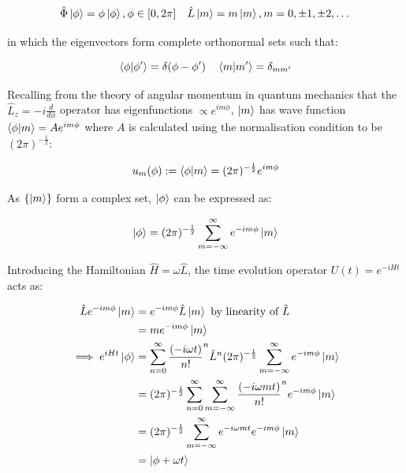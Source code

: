 \documentclass{article}
\begin{document}
\begin{equation}
	\hat{\Phi}\ket{\phi} = \phi\ket{\phi}, \phi \in [0,2\pi] \quad \hat{L}\ket{m} = m\ket{m}, m = 0, \pm 1, \pm 2,\dots
\end{equation}

\noindent in which the eigenvectors form complete orthonormal sets such that:

\begin{equation}
	\braket{\phi|\phi'} = \delta(\phi-\phi ') \quad \braket{m|m'} = \delta_{mm'}
\end{equation}

\noindent Recalling from the theory of angular momentum in quantum mechanics that the $\hat{L}_z = -i \frac{d}{d\phi}$ operator has eigenfunctions $\propto e^{im\phi}$, $\ket{m}$ has wave function $\braket{\phi|m}= Ae^{im\phi}$ where $A$ is calculated using the normalisation condition to be $(2\pi)^{-\frac{1}{2}}$:

\begin{equation}
	u_m(\phi) := \braket{\phi|m} = (2\pi)^{-\frac{1}{2}}e^{im\phi}
\end{equation}

\noindent As $\{\ket{m}\}$ form a complex set, $\ket{\phi}$ can be expressed as:

\begin{equation}
	\ket{\phi} = (2\pi)^{-\frac{1}{2}}\sum_{m=-\infty}^{\infty}e^{-im\phi}\ket{m}
	\label{phiexpansion}
\end{equation}

\noindent Introducing the Hamiltonian $\hat{H}=\omega \hat{L}$, the time evolution operator $U(t) = e^{-iHt}$ acts as:

\begin{align}
\hat{L}e^{-im\phi}\ket{m} &= e^{-im\phi}\hat{L}\ket{m} \text{ by linearity of } \hat{L} \\
				  &= me^{-im\phi}\ket{m} \\
\implies e^{iHt}\ket{\phi} &= \sum_{n=0}^{\infty}\frac{(-i\omega t)}{n!}^n \hat{L}^n (2\pi)^{-\frac{1}{2}}\sum_{m=-\infty}^{\infty}e^{-im\phi}\ket{m} \\
			   &= (2\pi)^{-\frac{1}{2}}\sum_{n=0}^{\infty}\sum_{m=-\infty}^{\infty} \frac{(-i\omega mt)}{n!}^n e^{-im\phi} \ket{m} \\
				   &= (2\pi)^{-\frac{1}{2}}\sum_{m=-\infty}^{\infty}e^{-i\omega mt}e^{-im\phi}\ket{m} \\
				   &= \ket{\phi+\omega t}
\end{align}
\end{document}

